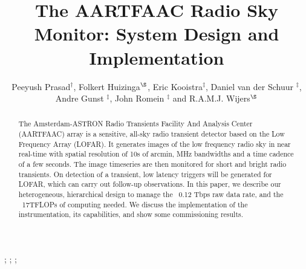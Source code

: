 \documentclass{ws-jai}
\begin{document}
\catchline{}{}{}{}{} %


\title{The AARTFAAC Radio Sky Monitor: System Design and Implementation}

\author{Peeyush Prasad$^\dagger$, Folkert Huizinga$^\S$, Eric Kooistra$^\ddagger$, Daniel van der Schuur $^\ddagger$, Andre Gunst $^\ddagger$, John Romein $^\ddagger$ and R.A.M.J. Wijers$^\S$}

\address{
$^\dagger$Anton Pannekoek Institute, University of Amsterdam, Amsterdam, The Netherlands, p.prasad@uva.nl\\
$^\ddagger$ASTRON, Oude Hoogeveensedijk, 7991PD, The Netherlands\\
$^\S$Anton Pannekoek Institute, University of Amsterdam, Amsterdam\\
}

\maketitle


\begin{history}
;
;
;
\end{history}

\begin{abstract}
The Amsterdam-ASTRON  Radio Transients  Facility And Analysis  Center (AARTFAAC)
array  is  a sensitive,  all-sky  radio  transient  detector  based on  the  Low
Frequency Array (LOFAR).  It generates images  of the low frequency radio sky in
near real-time  with spatial resolution of  10s of arcmin, MHz  bandwidths and a
time cadence of a few seconds. The image timeseries are then monitored for short
and bright radio  transients. On detection of a transient,  low latency triggers
will be  generated for LOFAR,  which can  carry out follow-up  observations.  In
this paper,  we describe  our heterogeneous, hierarchical  design to  manage the
~0.12 Tbps raw data rate, and the ~17TFLOPs of computing needed.  We discuss the
implementation  of   the  instrumentation,  its  capabilities,   and  show  some
commissioning results.
\end{abstract}

\end{document}
